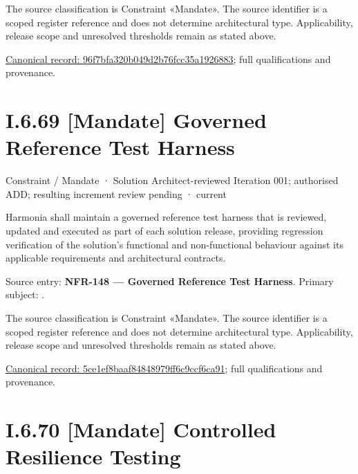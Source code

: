 The source classification is Constraint «Mandate». The source identifier is a scoped register reference and does not determine architectural type. Applicability, release scope and unresolved thresholds remain as stated above.


{\footnotesize \href{../../../../continuum/motivation/constraint/mandate/96f7bfa320b049d2b76fcc35a1926883.md}{Canonical record: 96f7bfa320b049d2b76fcc35a1926883}; full qualifications and provenance.}\par
\section*{I.6.69 [Mandate] Governed Reference Test Harness}
\label{navigation:I.6.69}

\label{element:5ce1ef8baaf84848979ff6c9ccf6ca91}
{\small Constraint / Mandate · Solution Architect-reviewed Iteration 001; authorised ADD; resulting increment review pending · current}\par

Harmonia shall maintain a governed reference test harness that is reviewed, updated and executed as part of each solution release, providing regression verification of the solution's functional and non-functional behaviour against its applicable requirements and architectural contracts.



Source entry: \textbf{NFR-148 — Governed Reference Test Harness}. Primary subject: \texttt{}.



The source classification is Constraint «Mandate». The source identifier is a scoped register reference and does not determine architectural type. Applicability, release scope and unresolved thresholds remain as stated above.


{\footnotesize \href{../../../../continuum/motivation/constraint/mandate/5ce1ef8baaf84848979ff6c9ccf6ca91.md}{Canonical record: 5ce1ef8baaf84848979ff6c9ccf6ca91}; full qualifications and provenance.}\par
\section*{I.6.70 [Mandate] Controlled Resilience Testing}
\label{navigation:I.6.70}

